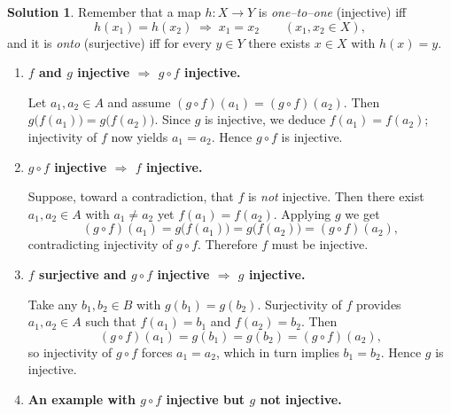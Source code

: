 \documentclass[12pt]{article}
\theoremstyle{definition} %
\newtheorem{solution}{Solution}
\theoremstyle{plain} %
\begin{document}
  \begin{solution}
  Remember that a map \(h:X\to Y\) is \emph{one–to–one} (injective) iff
  \[
  h(x_{1})=h(x_{2})\;\Longrightarrow\;x_{1}=x_{2}\qquad(x_{1},x_{2}\in X),
  \]
  and it is \emph{onto} (surjective) iff for every \(y\in Y\) there exists
  \(x\in X\) with \(h(x)=y\).
  
  \begin{enumerate}[label=(\alph*)]
  \item \textbf{\(f\) and \(g\) injective \(\Longrightarrow\) \(g\circ f\) injective.}
  
      Let \(a_{1},a_{2}\in A\) and assume
      \((g\circ f)(a_{1})=(g\circ f)(a_{2})\).
      Then \(g\bigl(f(a_{1})\bigr)=g\bigl(f(a_{2})\bigr)\).
      Since \(g\) is injective, we deduce \(f(a_{1})=f(a_{2})\);
      injectivity of \(f\) now yields \(a_{1}=a_{2}\).
      Hence \(g\circ f\) is injective.
  
  \item \textbf{\(g\circ f\) injective \(\Longrightarrow\) \(f\) injective.}
  
      Suppose, toward a contradiction, that \(f\) is \emph{not} injective.
      Then there exist \(a_{1},a_{2}\in A\) with
      \(a_{1}\ne a_{2}\) yet \(f(a_{1})=f(a_{2})\).
      Applying \(g\) we get
      \[
         (g\circ f)(a_{1})=g\bigl(f(a_{1})\bigr)
                         =g\bigl(f(a_{2})\bigr)
                         =(g\circ f)(a_{2}),
      \]
      contradicting injectivity of \(g\circ f\).
      Therefore \(f\) must be injective.
  
  \item \textbf{\(f\) surjective and \(g\circ f\) injective \(\Longrightarrow\) \(g\) injective.}
  
      Take any \(b_{1},b_{2}\in B\) with \(g(b_{1})=g(b_{2})\).
      Surjectivity of \(f\) provides \(a_{1},a_{2}\in A\) such that
      \(f(a_{1})=b_{1}\) and \(f(a_{2})=b_{2}\).
      Then
      \[
           (g\circ f)(a_{1}) = g(b_{1}) = g(b_{2}) = (g\circ f)(a_{2}),
      \]
      so injectivity of \(g\circ f\) forces \(a_{1}=a_{2}\),
      which in turn implies \(b_{1}=b_{2}\).
      Hence \(g\) is injective.
  
  \item \textbf{An example with \(g\circ f\) injective but \(g\) not injective.}
  

\end{enumerate}
\end{solution}
\end{document}
